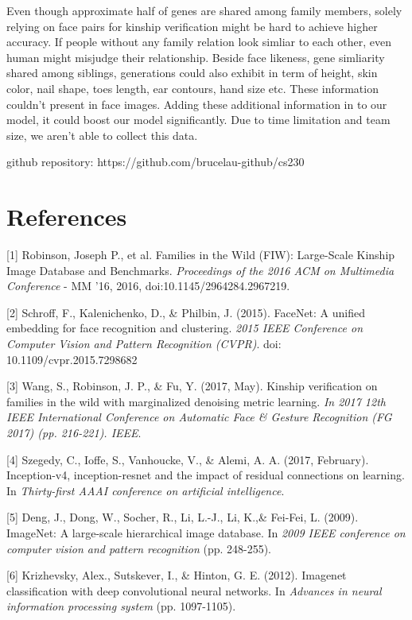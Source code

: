 \documentclass{article}
\begin{document}
Even though approximate half of genes are shared among family members, solely
relying on face pairs for kinship verification might be hard to achieve higher
accuracy. If people without any family relation look simliar to each other,
even human might misjudge their relationship. Beside face likeness, gene
simliarity shared among siblings, generations could also exhibit in term of
height, skin color, nail shape, toes length, ear contours, hand size etc. These
information couldn't present in face images. Adding these additional
information in to our model, it could boost our model significantly. Due to
time limitation and team size, we aren't able to collect this data.

github repository: https://github.com/brucelau-github/cs230

\newpage
\section*{References}
\medskip
\small
[1] Robinson, Joseph P., et al. Families in the Wild (FIW): Large-Scale Kinship
Image Database and Benchmarks. {\it Proceedings of the 2016 ACM on Multimedia
Conference} - MM '16, 2016, doi:10.1145/2964284.2967219.

[2] Schroff, F., Kalenichenko, D., \& Philbin, J. (2015). FaceNet: A unified
embedding for face recognition and clustering. {\it 2015 IEEE Conference on
Computer Vision and Pattern Recognition (CVPR)}. doi: 10.1109/cvpr.2015.7298682

[3] Wang, S., Robinson, J. P., \& Fu, Y. (2017, May). Kinship verification on
families in the wild with marginalized denoising metric learning. {\it In 2017 12th
IEEE International Conference on Automatic Face \& Gesture Recognition (FG 2017)
(pp. 216-221). IEEE}.

[4] Szegedy, C., Ioffe, S., Vanhoucke, V., \& Alemi, A. A. (2017, February).
Inception-v4, inception-resnet and the impact of residual connections on
learning. In {\it Thirty-first AAAI conference on artificial intelligence}.

[5] Deng, J., Dong, W., Socher, R., Li, L.-J., Li, K.,\& Fei-Fei, L. (2009).
ImageNet: A large-scale hierarchical image database. In {\it 2009 IEEE
conference on computer vision and pattern recognition} (pp. 248-255).

[6] Krizhevsky, Alex., Sutskever, I., \& Hinton, G. E. (2012). Imagenet
classification with deep convolutional neural networks. In {\it Advances in
neural information processing system} (pp. 1097-1105).
\end{document}

